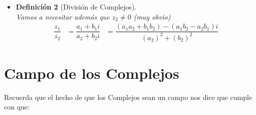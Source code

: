 \documentclass[12pt, fleqn]{report}                             %
\newcommand \ForceNewLine {$\Space$\\}                          %
\DeclareMathOperator \Space {\quad}                             %
\newtheorem{Definition}{Definición}[section]                    %
\newenvironment{MultiLineEquation}[1]                           %
        {\begin{equation}\begin{alignedat}{#1}}                     %
        {\end{alignedat}\end{equation}}                             %
\begin{document}
\begin{itemize}
\begin{Definition}[Multiplicación de Complejos]
                    \end{Definition}

                \item 
                    \begin{Definition}[División de Complejos]
                    \label{DivisionComplejos}
                    \ForceNewLine
                        Vamos a necesitar además que $z_2 \neq 0$ (muy obvio)
                        \begin{MultiLineEquation}{1}
                            \dfrac{z_1}{z_2}    &= \dfrac{a_1+b_1i}{a_2+b_2i} 
                                                &= \dfrac{(a_1a_2+b_1b_2)-(a_1b_2-a_2b_1)i}{(a_2)^2+(b_2)^2}
                        \end{MultiLineEquation}

                    \end{Definition}

            \end{itemize}


        \clearpage
        \section{Campo de los Complejos}

            Recuerda que el hecho de que los Complejos sean un campo nos dice que cumple con que:
\end{document}

